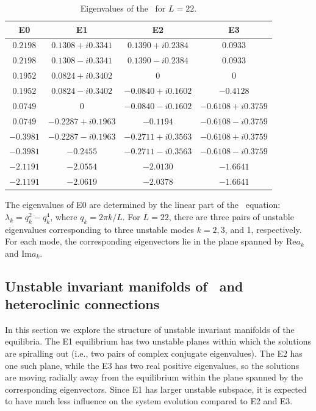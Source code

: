 \begin{table}
\caption{\label{tab:Ek_eigs} Eigenvalues of the \eqva\ for $L=22$.}
{\small
\begin{tabular}{cccc} \hline
  E0        &        E1         &         E2        &     E3   \\\hline
  $0.2198$ &  $0.1308+i0.3341$ &  $0.1390+i0.2384$ &  $0.0933$\\
  $0.2198$ &  $0.1308-i0.3341$ &  $0.1390-i0.2384$ &  $0.0933$\\
  $0.1952$ &  $0.0824+i0.3402$ &  $0$              &  $0$\\
  $0.1952$ &  $0.0824-i0.3402$ & $-0.0840+i0.1602$ & $-0.4128$\\
  $0.0749$ &  $0$              & $-0.0840-i0.1602$ & $-0.6108+i0.3759$\\
  $0.0749$ & $-0.2287+i0.1963$ & $-0.1194$         & $-0.6108-i0.3759$\\
 $-0.3981$ & $-0.2287-i0.1963$ & $-0.2711+i0.3563$ & $-0.6108+i0.3759$\\
 $-0.3981$ & $-0.2455$         & $-0.2711-i0.3563$ & $-0.6108-i0.3759$\\
 $-2.1191$ & $-2.0554$         & $-2.0130$         & $-1.6641$\\
 $-2.1191$ & $-2.0619$         & $-2.0378$         & $-1.6641$\\\hline
\end{tabular}}
\end{table}

The eigenvalues of E0 are determined by the linear part of the \KS\
equation: $\lambda_k=q_k^2-q_k^4$, where $q_k = 2\pi k/L$.  For
$L=22$, there are three pairs of unstable eigenvalues corresponding
to three unstable modes $k=2,3$, and 1, respectively.  For each
mode, the corresponding eigenvectors lie in the plane spanned by
$\mathrm{Re}a_k$ and $\mathrm{Im}a_k$.


\subsection{Unstable invariant manifolds of \eqva\ and heteroclinic
connections}

In this section we explore the structure of unstable invariant
manifolds of the equilibria.  The E1 equilibrium has two unstable
planes within which the solutions are spiralling out (i.e., two
pairs of complex conjugate eigenvalues).  The E2 has one such plane,
while the E3 has two real positive eigenvalues, so the solutions are
moving radially away from the equilibrium within the plane spanned
by the corresponding eigenvectors.  Since E1 has larger unstable
subspace, it is expected to have much less influence on the system
evolution compared to E2 and E3.

